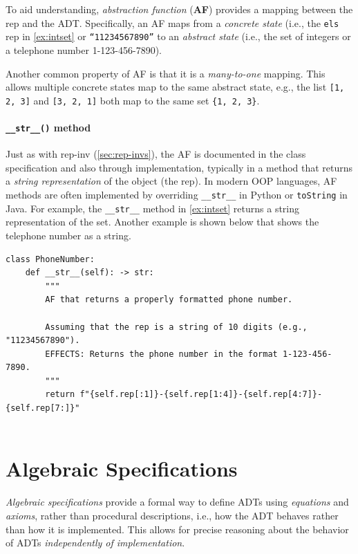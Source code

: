 \documentclass[oneside,11pt,dvipsnames]{book}
\newcommand{\code}[1]{\texttt{#1}}
\begin{document}
To aid understanding, \emph{abstraction function} (\textbf{AF}) provides a mapping between the rep and the ADT. 
Specifically, an AF maps from a \emph{concrete state} (i.e., the \code{els} rep in \autoref{ex:intset} or \code{``11234567890''} to an \emph{abstract state} (i.e., the set of integers or a telephone number 1-123-456-7890). 

Another common property of AF is that it is a \emph{many-to-one} mapping.  This allows multiple concrete states map to the same abstract state, e.g., the list \code{[1, 2, 3]} and \code{[3, 2, 1]} both map to the same set \code{\{1, 2, 3\}}. 

\paragraph{\code{\_\_str\_\_()} method} Just as with rep-inv (\autoref{sec:rep-invs}), the AF is documented in the class specification and also through implementation, typically in a method that returns a \emph{string representation} of the object (the rep). In modern OOP languages, AF methods are often implemented by overriding \code{\_\_str\_\_} in Python or \code{toString} in Java.  For example, the \code{\_\_str\_\_} method in \autoref{ex:intset} returns a string representation of the set. Another example is shown below that shows the telephone number as a string.

\begin{lstlisting}
class PhoneNumber:
    def __str__(self): -> str:
        """
        AF that returns a properly formatted phone number.
        
        Assuming that the rep is a string of 10 digits (e.g., "11234567890").
        EFFECTS: Returns the phone number in the format 1-123-456-7890.
        """
        return f"{self.rep[:1]}-{self.rep[1:4]}-{self.rep[4:7]}-{self.rep[7:]}"
      
\end{lstlisting}    

\section{Algebraic Specifications}\label{sec:algebraic-specifications}

\emph{Algebraic specifications} provide a formal way to define ADTs using \emph{equations} and \emph{axioms}, rather than procedural descriptions, i.e., how the ADT behaves rather than how it is implemented. This allows for precise reasoning about the behavior of ADTs \emph{independently of implementation}. 
\end{document}
